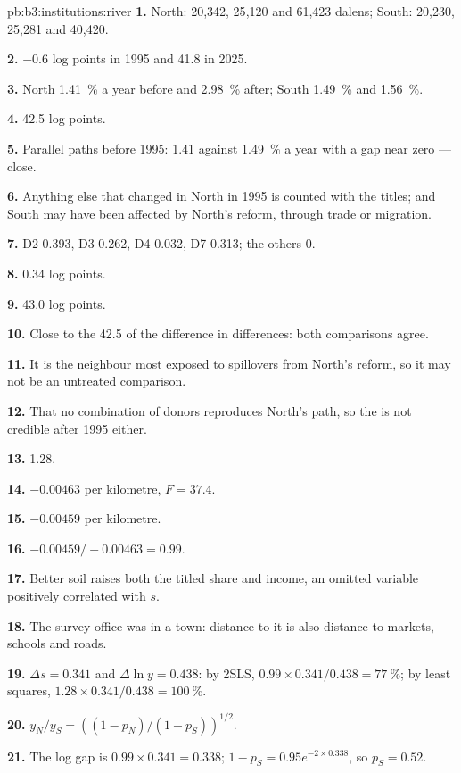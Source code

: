\begin{solution}{pb:b3:institutions:river}
\textbf{1.} North: 20{,}342, 25{,}120 and 61{,}423 dalens; South: 20{,}230, 25{,}281 and 40{,}420.

\textbf{2.} $-0.6$ log points in 1995 and 41.8 in 2025.

\textbf{3.} North 1.41~\% a year before and 2.98~\% after; South 1.49~\% and 1.56~\%.

\textbf{4.} 42.5 log points.

\textbf{5.} Parallel paths before 1995: 1.41 against 1.49~\% a year with a gap near zero --- close.

\textbf{6.} Anything else that changed in North in 1995 is counted with the titles; and
South may have been affected by North's reform, through trade or migration.

\textbf{7.} D2 0.393, D3 0.262, D4 0.032, D7 0.313; the others 0.

\textbf{8.} 0.34 log points.

\textbf{9.} 43.0 log points.

\textbf{10.} Close to the 42.5 of the difference in differences: both comparisons agree.

\textbf{11.} It is the neighbour most exposed to spillovers from North's reform, so it
may not be an untreated comparison.

\textbf{12.} That no combination of donors reproduces North's path, so the  is not credible after 1995 either.

\textbf{13.} 1.28.

\textbf{14.} $-0.00463$ per kilometre, $F = 37.4$.

\textbf{15.} $-0.00459$ per kilometre.

\textbf{16.} $-0.00459/-0.00463 = 0.99$.

\textbf{17.} Better soil raises both the titled share and income, an omitted variable
positively correlated with $s$.

\textbf{18.} The survey office was in a town: distance to it is also distance to
markets, schools and roads.

\textbf{19.} $\Delta s = 0.341$ and $\Delta\ln y = 0.438$: by 2SLS, $0.99 \times 0.341/0.438 = 77~\%$; by least squares, $1.28 \times 0.341/0.438 = 100~\%$.

\textbf{20.} $y_N/y_S = ((1 - p_N)/(1 - p_S))^{1/2}$.

\textbf{21.} The log gap is $0.99 \times 0.341 = 0.338$; $1 - p_S = 0.95e^{-2 \times 0.338}$, so $p_S = 0.52$.


\end{solution}
